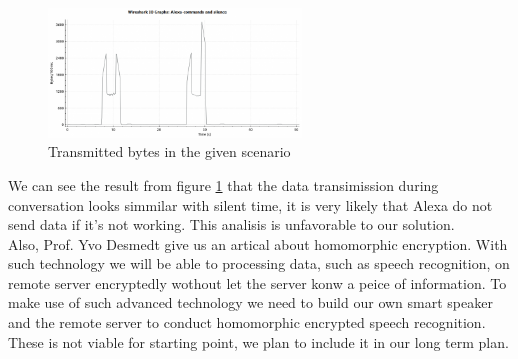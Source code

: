 \documentclass[12pt,twoside]{article}
\begin{document}
\begin{itemize}
\begin{figure}[!htb]
\centering
\includegraphics[width=0.6\textwidth]{alexa_wakeup_and_pause-400x204.png}
\caption{Transmitted bytes in the given scenario}
\label{fig:Transmitted bytes in the given scenario}
\end{figure}

We can see the result from figure \ref{fig:Transmitted bytes in the given scenario} that the data transimission during conversation looks simmilar with
silent time, it is very likely that Alexa do not send data if it's not working. This analisis is unfavorable to our solution.\\
Also, Prof. Yvo Desmedt give us an artical \cite{bourse2017fast} about homomorphic encryption. With such technology we will be able to processing data, 
such as speech recognition, on remote server encryptedly wothout let the server konw a peice of information. To make use of such advanced technology 
we need to build our own smart speaker and the remote server to conduct homomorphic encrypted speech recognition. These is not viable for starting point, 
we plan to include it in our long term plan. 


\end{itemize}
\end{document}

